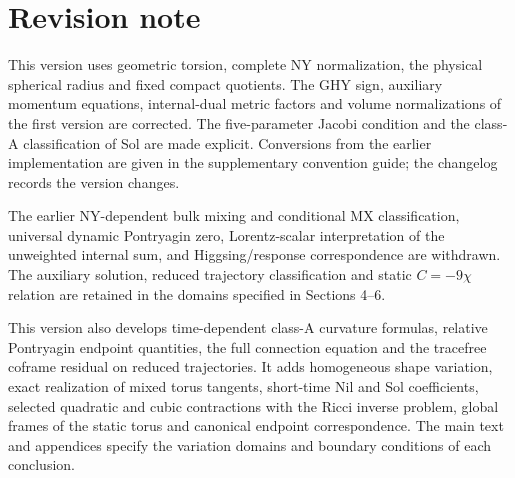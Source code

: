 \section{Revision note}

This version uses geometric torsion, complete NY normalization, the physical spherical radius and fixed compact quotients. The GHY sign, auxiliary momentum equations, internal-dual metric factors and volume normalizations of the first version are corrected. The five-parameter Jacobi condition and the class-A classification of Sol are made explicit. Conversions from the earlier implementation are given in the supplementary convention guide; the changelog records the version changes.

The earlier NY-dependent bulk mixing and conditional MX classification, universal dynamic Pontryagin zero, Lorentz-scalar interpretation of the unweighted internal sum, and Higgsing/response correspondence are withdrawn. The auxiliary solution, reduced trajectory classification and static $C=-9\chi$ relation are retained in the domains specified in Sections 4--6.

This version also develops time-dependent class-A curvature formulas, relative Pontryagin endpoint quantities, the full connection equation and the tracefree coframe residual on reduced trajectories. It adds homogeneous shape variation, exact realization of mixed torus tangents, short-time Nil and Sol coefficients, selected quadratic and cubic contractions with the Ricci inverse problem, global frames of the static torus and canonical endpoint correspondence. The main text and appendices specify the variation domains and boundary conditions of each conclusion.
